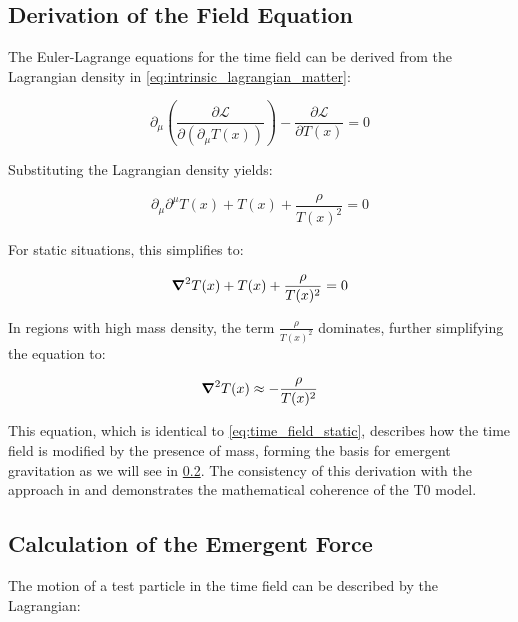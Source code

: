 \documentclass[12pt,a4paper]{article}
\newcommand{\Tfield}{T(x)}
\begin{document}
	\subsection{Derivation of the Field Equation}
	\label{subsec:field_equation}
	The Euler-Lagrange equations for the time field can be derived from the Lagrangian density in \cref{eq:intrinsic_lagrangian_matter}:
	
	\begin{equation}
		\label{eq:euler_lagrange}
		\partial_\mu \left( \frac{\partial \mathcal{L}}{\partial(\partial_\mu \Tfield)} \right) - \frac{\partial \mathcal{L}}{\partial \Tfield} = 0
	\end{equation}
	
	Substituting the Lagrangian density yields:
	
	\begin{equation}
		\label{eq:substituted_euler_lagrange}
		\partial_\mu \partial^\mu \Tfield + \Tfield + \frac{\rho}{\Tfield^2} = 0
	\end{equation}
	
	For static situations, this simplifies to:
	
	\begin{equation}
		\label{eq:field_equation_static}
		\grad^2 \Tfield + \Tfield + \frac{\rho}{\Tfield^2} = 0
	\end{equation}
	
	In regions with high mass density, the term \(\frac{\rho}{\Tfield^2}\) dominates, further simplifying the equation to:
	
	\begin{equation}
		\label{eq:field_equation_high_density}
		\grad^2 \Tfield \approx -\frac{\rho}{\Tfield^2}
	\end{equation}
	
	This equation, which is identical to \cref{eq:time_field_static}, describes how the time field is modified by the presence of mass, forming the basis for emergent gravitation as we will see in \cref{subsec:emergent_force}. The consistency of this derivation with the approach in \cite{pascher_lagrange_2025} and \cite{pascher_higgs_2025} demonstrates the mathematical coherence of the T0 model.
	
	\subsection{Calculation of the Emergent Force}
	\label{subsec:emergent_force}
	The motion of a test particle in the time field can be described by the Lagrangian:
	
\end{document}
